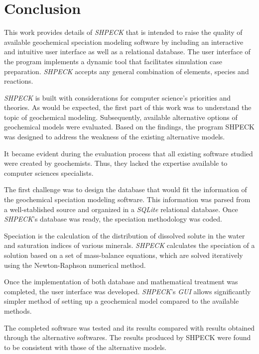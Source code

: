 
\chapter{Conclusion}
\label{chapter:conclusion}

This work provides details of \emph{SHPECK} that is intended to raise the quality of available geochemical speciation modeling software by including an interactive and intuitive user interface as well as a relational database. The user interface of the program implements a dynamic tool that facilitates simulation case preparation. \emph{SHPECK} accepts any general combination of elements, species and reactions.

\emph{SHPECK} is built with considerations for computer science's priorities and theories. As would be expected, the first part of this work was to understand the topic of geochemical modeling. Subsequently, available alternative options of geochemical models were evaluated. Based on the findings, the program SHPECK was designed to address the weakness of the existing alternative models. 

It became evident during the evaluation process that all existing software studied were created by geochemists. Thus, they lacked the expertise available to computer sciences specialists. 

The first challenge was to design the database that would fit the information of the geochemical speciation modeling software. This information was parsed from a well-stablished source and organized in a \emph{SQLite} relational database. Once \emph{SHPECK}'s database was ready, the speciation methodology was coded.

Speciation is the calculation of the distribution of dissolved solute in the water and saturation indices of various minerals. \emph{SHPECK} calculates the speciation of a solution based on a set of mass-balance equations, which are solved iteratively using the Newton-Raphson numerical method.

Once the implementation of both database and mathematical treatment was completed, the user interface was developed. \emph{SHPECK}'s \emph{GUI} allows significantly simpler method of setting up a geochemical model compared to the available methods.

The completed software was tested and its results compared with results obtained through the alternative softwares. The results produced by SHPECK were found to be consistent with those of the alternative models.

